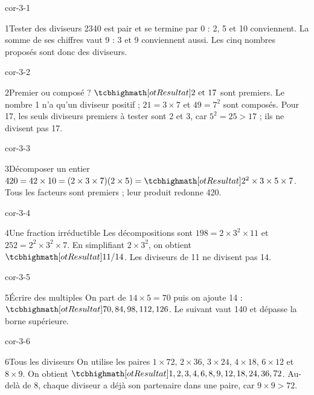 \clearpage\pagestyle{otMain}\fontsize{11}{15}\selectfont{}
\begin{blocLivre}{cor-3-1}\begin{corrige}{1}{Tester des diviseurs}
2340 est pair et se termine par 0 : 2, 5 et 10 conviennent. La somme de ses chiffres vaut 9 : 3 et 9 conviennent aussi. Les cinq nombres proposés sont donc des diviseurs.
\end{corrige}\end{blocLivre}
\begin{blocLivre}{cor-3-2}\begin{corrige}{2}{Premier ou composé ?}
$\res{2\text{ et }17}$ sont premiers. Le nombre 1 n’a qu’un diviseur positif ; $21=3\times7$ et $49=7^2$ sont composés. Pour 17, les seuls diviseurs premiers à tester sont 2 et 3, car $5^2=25>17$ ; ils ne divisent pas 17.
\end{corrige}\end{blocLivre}
\begin{blocLivre}{cor-3-3}\begin{corrige}{3}{Décomposer un entier}
$420=42\times10=(2\times3\times7)(2\times5)=\res{2^2\times3\times5\times7}$. Tous les facteurs sont premiers ; leur produit redonne 420.
\end{corrige}\end{blocLivre}
\begin{blocLivre}{cor-3-4}\begin{corrige}{4}{Une fraction irréductible}
Les décompositions sont $198=2\times3^2\times11$ et $252=2^2\times3^2\times7$. En simplifiant $2\times3^2$, on obtient $\res{11/14}$. Les diviseurs de 11 ne divisent pas 14.
\end{corrige}\end{blocLivre}
\begin{blocLivre}{cor-3-5}\begin{corrige}{5}{Écrire des multiples}
On part de $14\times5=70$ puis on ajoute 14 : $\res{70,84,98,112,126}$. Le suivant vaut 140 et dépasse la borne supérieure.
\end{corrige}\end{blocLivre}
\begin{blocLivre}{cor-3-6}\begin{corrige}{6}{Tous les diviseurs}
On utilise les paires $1\times72$, $2\times36$, $3\times24$, $4\times18$, $6\times12$ et $8\times9$. On obtient $\res{1,2,3,4,6,8,9,12,18,24,36,72}$. Au-delà de 8, chaque diviseur a déjà son partenaire dans une paire, car $9\times9>72$.
\end{corrige}\end{blocLivre}
